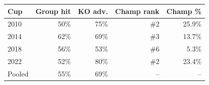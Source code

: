 \begin{tabular}{lrrrr}
\toprule
Cup & Group hit & KO adv. & Champ rank & Champ \% \\
\midrule
2010 & 50\% & 75\% & \#2 & 25.9\% \\
2014 & 62\% & 69\% & \#3 & 13.7\% \\
2018 & 56\% & 53\% & \#6 & 5.3\% \\
2022 & 52\% & 80\% & \#2 & 23.4\% \\
\midrule
Pooled & 55\% & 69\% & -- & -- \\
\bottomrule
\end{tabular}